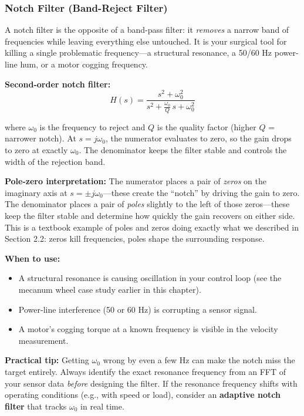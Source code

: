 \subsubsection{Notch Filter (Band-Reject Filter)}

A notch filter is the opposite of a band-pass filter: it \emph{removes} a narrow band of frequencies while leaving everything else untouched. It is your surgical tool for killing a single problematic frequency---a structural resonance, a 50/60 Hz power-line hum, or a motor cogging frequency.

\textbf{Second-order notch filter:}
\begin{equation}
H(s) = \frac{s^2 + \omega_0^2}{s^2 + \frac{\omega_0}{Q}\,s + \omega_0^2}
\end{equation}

where $\omega_0$ is the frequency to reject and $Q$ is the quality factor (higher $Q$ = narrower notch). At $s = j\omega_0$, the numerator evaluates to zero, so the gain drops to zero at exactly $\omega_0$. The denominator keeps the filter stable and controls the width of the rejection band.

\textbf{Pole-zero interpretation:} The numerator places a pair of \textit{zeros} on the imaginary axis at $s = \pm j\omega_0$---these create the ``notch'' by driving the gain to zero. The denominator places a pair of \textit{poles} slightly to the left of those zeros---these keep the filter stable and determine how quickly the gain recovers on either side. This is a textbook example of poles and zeros doing exactly what we described in Section 2.2: zeros kill frequencies, poles shape the surrounding response.

\textbf{When to use:}
\begin{itemize}[nosep]
    \item A structural resonance is causing oscillation in your control loop (see the mecanum wheel case study earlier in this chapter).
    \item Power-line interference (50 or 60 Hz) is corrupting a sensor signal.
    \item A motor's cogging torque at a known frequency is visible in the velocity measurement.
\end{itemize}

\textbf{Practical tip:} Getting $\omega_0$ wrong by even a few Hz can make the notch miss the target entirely. Always identify the exact resonance frequency from an FFT of your sensor data \textit{before} designing the filter. If the resonance frequency shifts with operating conditions (e.g., with speed or load), consider an \textbf{adaptive notch filter} that tracks $\omega_0$ in real time.

